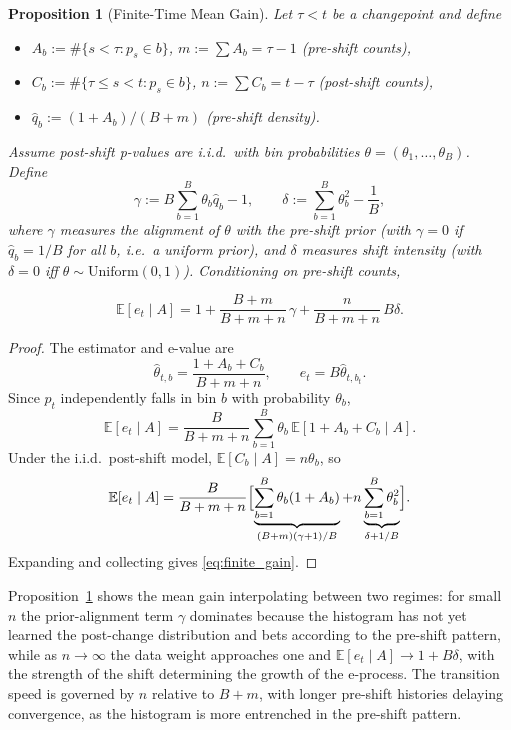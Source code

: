 \documentclass[ejsv2, noshowframe]{imsart}
\theoremstyle{plain}
\newtheorem{proposition}{Proposition}
\theoremstyle{definition}
\theoremstyle{remark}
\newcommand{\E}{\mathbb{E}}
\newcommand{\Unif}{\mathrm{Uniform}}
\begin{document}
\begin{proposition}[Finite-Time Mean Gain]
\label{prop:finite_time}
Let $\tau < t$ be a changepoint and define
\begin{itemize}
 \item $A_b := \#\{s < \tau : p_s \in b\}$, \quad $m := \sum A_b = \tau - 1$ \hfill (pre-shift counts),
 \item $C_b := \#\{\tau \le s < t : p_s \in b\}$, \quad $n := \sum C_b = t - \tau$ \hfill (post-shift counts),
 \item $\hat q_b := (1+A_b)/(B+m)$ \hfill (pre-shift density).
\end{itemize}
Assume post-shift p-values are i.i.d.\ with bin probabilities
$\theta=(\theta_1,\ldots,\theta_B)$. Define
$$
\gamma := B\sum_{b=1}^B \theta_b \hat q_b - 1,
\qquad
\delta := \sum_{b=1}^B \theta_b^2 - \frac{1}{B},
$$
where $\gamma$ measures the alignment of $\theta$ with the pre-shift prior (with $\gamma=0$ if $\hat q_b=1/B$ for all $b$, i.e.\ a uniform prior), and $\delta$ measures shift intensity (with $\delta=0$ iff $\theta \sim \Unif(0,1)$). Conditioning on pre-shift counts,

\begin{equation}
\label{eq:finite_gain}
\E[e_t\mid A] = 1 + \frac{B+m}{B+m+n}\,\gamma + \frac{n}{B+m+n}\,B\delta.
\end{equation}
\end{proposition}
\begin{proof}
The estimator and e-value are
$$
\hat\theta_{t,b} = \frac{1 + A_b + C_b}{B + m + n},
\qquad
e_t = B\hat\theta_{t,b_t}.
$$
Since $p_t$ independently falls in bin $b$ with probability $\theta_b$,
$$
\E[e_t \mid A] = \frac{B}{B+m+n} \sum_{b=1}^B \theta_b \, \E[1 + A_b + C_b \mid A].
$$
Under the i.i.d.\ post-shift model, $\E[C_b \mid A] = n\theta_b$, so
$$
\E[e_t \mid A] = \frac{B}{B+m+n} \Bigl[\underbrace{\sum_{b=1}^B \theta_b(1+A_b)}_{(B+m)(\gamma+1)/B} + n \underbrace{\sum_{b=1}^B \theta_b^2}_{\delta + 1/B}\Bigr].
$$
Expanding and collecting gives \eqref{eq:finite_gain}.
\end{proof}

\noindent Proposition~\ref{prop:finite_time} shows the mean gain interpolating between two regimes: for small $n$ the prior-alignment term $\gamma$ dominates because the histogram has not yet learned the post-change distribution and bets according to the pre-shift pattern, while as $n\to\infty$ the data weight approaches one and $\E[e_t\mid A]\to 1+B\delta$, with the strength of the shift determining the growth of the e-process. The transition speed is governed by $n$ relative to $B+m$, with longer pre-shift histories delaying convergence, as the histogram is more entrenched in the pre-shift pattern.
\end{document}

